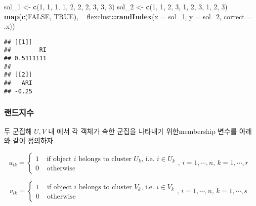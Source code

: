 \documentclass[]{book}
\newenvironment{Shaded}{\begin{snugshade}}{\end{snugshade}}
\newcommand{\DataTypeTok}[1]{\textcolor[rgb]{0.13,0.29,0.53}{#1}}
\newcommand{\DecValTok}[1]{\textcolor[rgb]{0.00,0.00,0.81}{#1}}
\newcommand{\KeywordTok}[1]{\textcolor[rgb]{0.13,0.29,0.53}{\textbf{#1}}}
\newcommand{\NormalTok}[1]{#1}
\newcommand{\OperatorTok}[1]{\textcolor[rgb]{0.81,0.36,0.00}{\textbf{#1}}}
\newcommand{\OtherTok}[1]{\textcolor[rgb]{0.56,0.35,0.01}{#1}}
\newcommand{\StringTok}[1]{\textcolor[rgb]{0.31,0.60,0.02}{#1}}
\begin{document}
\begin{Shaded}
\begin{Highlighting}[]
\NormalTok{sol_}\DecValTok{1}\NormalTok{ <-}\StringTok{ }\KeywordTok{c}\NormalTok{(}\DecValTok{1}\NormalTok{, }\DecValTok{1}\NormalTok{, }\DecValTok{1}\NormalTok{, }\DecValTok{1}\NormalTok{, }\DecValTok{2}\NormalTok{, }\DecValTok{2}\NormalTok{, }\DecValTok{2}\NormalTok{, }\DecValTok{3}\NormalTok{, }\DecValTok{3}\NormalTok{, }\DecValTok{3}\NormalTok{)}
\NormalTok{sol_}\DecValTok{2}\NormalTok{ <-}\StringTok{ }\KeywordTok{c}\NormalTok{(}\DecValTok{1}\NormalTok{, }\DecValTok{1}\NormalTok{, }\DecValTok{2}\NormalTok{, }\DecValTok{3}\NormalTok{, }\DecValTok{1}\NormalTok{, }\DecValTok{2}\NormalTok{, }\DecValTok{3}\NormalTok{, }\DecValTok{1}\NormalTok{, }\DecValTok{2}\NormalTok{, }\DecValTok{3}\NormalTok{)}
\KeywordTok{map}\NormalTok{(}\KeywordTok{c}\NormalTok{(}\OtherTok{FALSE}\NormalTok{, }\OtherTok{TRUE}\NormalTok{), }
    \OperatorTok{~}\StringTok{ }\NormalTok{flexclust}\OperatorTok{::}\KeywordTok{randIndex}\NormalTok{(}\DataTypeTok{x =}\NormalTok{ sol_}\DecValTok{1}\NormalTok{, }\DataTypeTok{y =}\NormalTok{ sol_}\DecValTok{2}\NormalTok{, }\DataTypeTok{correct =}\NormalTok{ .x))}
\end{Highlighting}
\end{Shaded}

\begin{verbatim}
## [[1]]
##        RI 
## 0.5111111 
## 
## [[2]]
##   ARI 
## -0.25
\end{verbatim}

\hypertarget{cluster-external-rand-index}{%
\subsubsection{랜드지수}\label{cluster-external-rand-index}}

두 군집해 \(U, V\) 내 에서 각 객체가 속한 군집을 나타내기 위한membership 변수를 아래와 같이 정의하자.

\begin{equation*}
u_{ik} = \begin{cases}
1 & \text{ if object $i$ belongs to cluster $U_k$, i.e. } i \in U_k \\
0 & \text{ otherwise}
\end{cases}, \, i = 1, \cdots, n, \, k = 1, \cdots, r
\end{equation*}

\begin{equation*}
v_{ik} = \begin{cases}
1 & \text{ if object $i$ belongs to cluster $V_k$, i.e. } i \in V_k \\
0 & \text{ otherwise}
\end{cases}, \, i = 1, \cdots, n, \, k = 1, \cdots, s
\end{equation*}
\end{document}
